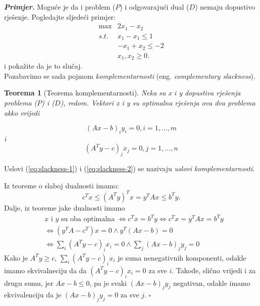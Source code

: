 \documentclass[a4paper, utf8, 11pt, colorlinks]{book}
\newtheorem{thm}{Teorema}
\newenvironment{proof}{{Dokaz:}}{\hfill$\square$}
\begin{document}
\emph{\textbf{Primjer.}} Moguće je da i problem ($P$) i odgovarajući dual ($D$) nemaju dopustivo rješenje. Pogledajte sljedeći primjer:
$$\begin{array}{cc}
    \max          & 2 x_1 - x_2 \\
     {s.t. }      & x_1 - x_1 \leq 1 \\
                  & -x_1 + x_2 \leq -2 \\
                  & x_1, x_2 \geq 0.
\end{array}$$
i pokažite da je to slučaj.\\

Pozabavimo se sada pojmom \emph{komplementarnosti} (eng. \emph{complementary slackness}). 
\begin{thm}[Teorema komplementarnosti]
      Neka su x i y dopustiva rješenja problema ($P$) i  ($D$), redom. Vektori x i y su optimalna rješenja ova dva problema akko vrijedi 
      
            \begin{equation}\label{eq:slackness-2}
      	(Ax - b)_i y_i = 0, i=1,\ldots,m
      \end{equation}
   i
      \begin{equation}\label{eq:slackness-1}
           (A^Ty - c)_j x_j = 0, j=1,\ldots,n
      \end{equation}   

\end{thm}
Uslovi (\ref{eq:slackness-1}) i (\ref{eq:slackness-2}) se nazivaju \emph{uslovi komplementarnosti}.

\begin{proof}
         Iz teoreme o slaboj dualnosti imamo: 
         \begin{equation}
             c^Tx \leq ( A^T y)^T x = y^T A x \leq b^T y. 
         \end{equation}
         Dalje, iz teoreme jake dualnosti imamo  
         \begin{align*}
             &x \mbox{ i } y \mbox{ su oba optimalna } \Longleftrightarrow c^T x = b^T y \Longleftrightarrow c^Tx = y^TA x = b^Ty \\
             &\Longleftrightarrow (y^T A - c^T) x = 0 \wedge y^T(Ax - b )  = 0\\
             & \Longleftrightarrow \sum_i (A^T y - c)_i x_i = 0 \wedge \sum_j (Ax - b)_j y_j = 0
         \end{align*}
         Kako je $A^Ty \geq c$, $\sum_i (A^T y - c)_i x_i$ je suma nenegativnih komponenti, odakle imamo ekvivalneciju da  da   $(A^T y - c)_i x_i= 0$ za sve $i$. Takođe, slično vrijedi i za drugu sumu, jer $Ax - b \leq 0$, pa je svaki  $(Ax - b)_j y_j$ negativan, odakle imamo ekvivalenciju da je $(Ax - b)_j y_j = 0$ za sve $j$.
\end{proof}
\end{document}
